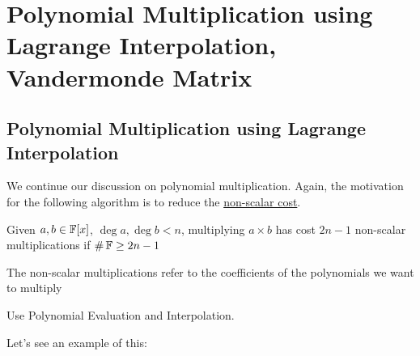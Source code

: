 
\section{Polynomial Multiplication using Lagrange Interpolation, Vandermonde Matrix}

\subsection{Polynomial Multiplication using Lagrange Interpolation}
We continue our discussion on polynomial multiplication.
Again, the motivation for the following algorithm is to reduce the \underline{non-scalar cost}.

\begin{theorem}{}{}
    Given $a,b \in \operatorname{\mathbb{F}}[x]$, $\deg a, \deg b < n$, multiplying $a \times b$ has cost $2n - 1$ non-scalar multiplications if $\#\operatorname{\mathbb{F}} \geq 2n - 1$
\end{theorem}
\begin{note}
    The non-scalar multiplications refer to the coefficients of the polynomials we want to multiply
\end{note}

\begin{idea}
Use Polynomial Evaluation and Interpolation.
\end{idea}
Let's see an example of this:

